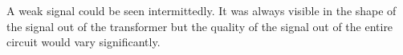 % 

A weak signal could be seen intermittedly. It was always visible in the shape of the signal out of the transformer but the quality of the 
signal out of the entire circuit would vary significantly.